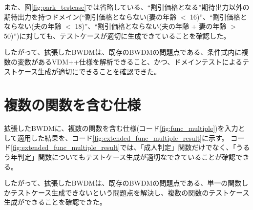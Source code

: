 \documentclass[uplatex, report, a4j, 10pt]{jsbook}
\begin{document}
また、図\ref{fig:park_testcase}では省略している、“割引価格となる”期待出力以外の期待出力を持つドメイン(“割引価格とならない(妻の年齢 $<$ 16)”、“割引価格とならない(夫の年齢 $<$ 18)”、“割引価格とならない(夫の年齢 + 妻の年齢 $>$ 50)”)に対しても、テストケースが適切に生成できていることを確認した。

したがって、拡張したBWDMは、既存のBWDMの問題点である、条件式内に複数の変数があるVDM++仕様を解析できること、かつ、ドメインテストによるテストケース生成が適切にできることを確認できた。


\section{複数の関数を含む仕様}
拡張したBWDMに、複数の関数を含む仕様(コード\ref{fig:func_multiple})を入力として適用した結果を、コード\ref{fig:extended_func_multiple_result}に示す。
コード\ref{fig:extended_func_multiple_result}では、「成人判定」関数だけでなく、「うるう年判定」関数についてもテストケース生成が適切なできていることが確認できる。

したがって、拡張したBWDMは、既存のBWDMの問題点である、単一の関数しかテストケース生成できないという問題点を解決し、複数の関数のテストケース生成ができることを確認できた。
\end{document}
